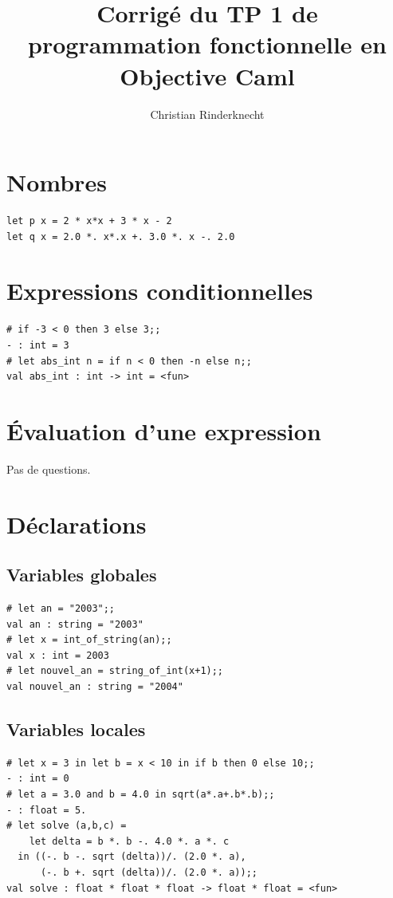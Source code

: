 \documentclass[11pt, a4paper]{article}
\title{Corrigé du TP 1 de programmation fonctionnelle en Objective Caml}
\author{Christian Rinderknecht}
\begin{document}
\maketitle

\section{Nombres}

\begin{verbatim}
let p x = 2 * x*x + 3 * x - 2
let q x = 2.0 *. x*.x +. 3.0 *. x -. 2.0
\end{verbatim}

\section{Expressions conditionnelles}

\begin{verbatim}
# if -3 < 0 then 3 else 3;;
- : int = 3
# let abs_int n = if n < 0 then -n else n;;
val abs_int : int -> int = <fun>
\end{verbatim}

\section{Évaluation d'une expression}

Pas de questions.

\section{Déclarations}

\subsection{Variables globales}

\begin{verbatim}
# let an = "2003";;
val an : string = "2003"
# let x = int_of_string(an);;
val x : int = 2003
# let nouvel_an = string_of_int(x+1);;
val nouvel_an : string = "2004"
\end{verbatim}

\subsection{Variables locales}

\begin{verbatim}
# let x = 3 in let b = x < 10 in if b then 0 else 10;;
- : int = 0
# let a = 3.0 and b = 4.0 in sqrt(a*.a+.b*.b);;
- : float = 5.
# let solve (a,b,c) =
    let delta = b *. b -. 4.0 *. a *. c
  in ((-. b -. sqrt (delta))/. (2.0 *. a),
      (-. b +. sqrt (delta))/. (2.0 *. a));;
val solve : float * float * float -> float * float = <fun>
\end{verbatim}
\end{document}
